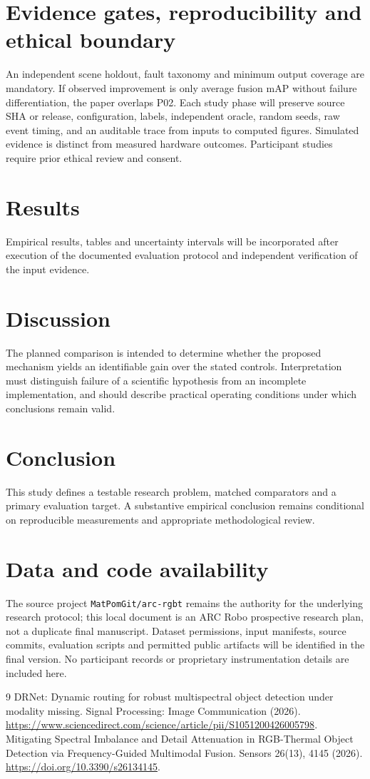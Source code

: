 \documentclass[11pt,a4paper]{article}
\begin{document}
\section{Evidence gates, reproducibility and ethical boundary}
An independent scene holdout, fault taxonomy and minimum output coverage are mandatory. If observed improvement is only average fusion mAP without failure differentiation, the paper overlaps P02. Each study phase will preserve source SHA or release, configuration, labels, independent oracle, random seeds, raw event timing, and an auditable trace from inputs to computed figures. Simulated evidence is distinct from measured hardware outcomes. Participant studies require prior ethical review and consent.

\section{Results}
Empirical results, tables and uncertainty intervals will be incorporated after execution of the documented evaluation protocol and independent verification of the input evidence.

\section{Discussion}
The planned comparison is intended to determine whether the proposed mechanism yields an identifiable gain over the stated controls. Interpretation must distinguish failure of a scientific hypothesis from an incomplete implementation, and should describe practical operating conditions under which conclusions remain valid.

\section{Conclusion}
This study defines a testable research problem, matched comparators and a primary evaluation target. A substantive empirical conclusion remains conditional on reproducible measurements and appropriate methodological review.

\section{Data and code availability}
The source project \texttt{MatPomGit/arc-rgbt} remains the authority for the underlying research protocol; this local document is an ARC Robo prospective research plan, not a duplicate final manuscript. Dataset permissions, input manifests, source commits, evaluation scripts and permitted public artifacts will be identified in the final version. No participant records or proprietary instrumentation details are included here.
\begin{thebibliography}{9}
 DRNet: Dynamic routing for robust multispectral object detection under modality missing. Signal Processing: Image Communication (2026). \url{https://www.sciencedirect.com/science/article/pii/S1051200426005798}.
 Mitigating Spectral Imbalance and Detail Attenuation in RGB-Thermal Object Detection via Frequency-Guided Multimodal Fusion. Sensors 26(13), 4145 (2026). \url{https://doi.org/10.3390/s26134145}.
\end{thebibliography}
\end{document}
